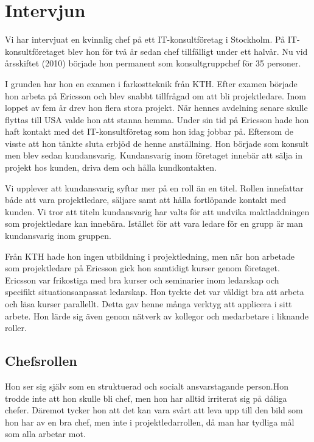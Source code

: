 \documentclass[a4paper,10pt,twoside]{article}
\begin{document}

\section{Intervjun} %
\label{sec:intervjun}

Vi har intervjuat en kvinnlig chef på ett IT-konsultföretag i Stockholm. På IT-konsultföretaget blev hon för två år sedan chef tillfälligt under ett halvår. Nu vid årsskiftet (2010) började hon permanent som konsultgruppchef för 35 personer.

I grunden har hon en examen i farkostteknik från KTH. Efter examen började hon arbeta på Ericsson och blev snabbt tillfrågad om att bli projektledare. Inom loppet av fem år drev hon flera stora projekt. När hennes avdelning senare skulle flyttas till USA valde hon att stanna hemma. Under sin tid på Ericsson hade hon haft kontakt med det IT-konsultföretag som hon idag jobbar på. Eftersom de visste att hon tänkte sluta erbjöd de henne anställning. Hon började som konsult men blev sedan kundansvarig. Kundansvarig inom företaget innebär att sälja in projekt hos kunden, driva dem och hålla kundkontakten.

Vi upplever att kundansvarig syftar mer på en roll än en titel. Rollen innefattar både att vara projektledare, säljare samt att hålla fortlöpande kontakt med kunden. Vi tror att titeln kundansvarig har valts för att undvika maktladdningen som projektledare kan innebära. Istället för att vara ledare för en grupp är man kundansvarig inom gruppen.

Från KTH hade hon ingen utbildning i projektledning, men när hon arbetade som projektledare på Ericsson gick hon samtidigt kurser genom företaget. Ericsson var frikostiga med bra kurser och seminarier inom ledarskap och specifikt situationsanpassat ledarskap. Hon tyckte det var väldigt bra att arbeta och läsa kurser parallellt. Detta gav henne många verktyg att applicera i sitt arbete. Hon lärde sig även genom nätverk av kollegor och medarbetare i liknande roller.

\subsection{Chefsrollen} %
\label{sub:chefsrollen}
Hon ser sig själv som en struktuerad och socialt ansvarstagande person.Hon trodde inte att hon skulle bli chef, men hon har alltid irriterat sig på dåliga chefer. Däremot tycker hon att det kan vara svårt att leva upp till den bild som hon har av en bra chef, men inte i projektledarrollen, då man har tydliga mål som alla arbetar mot.
\end{document}
